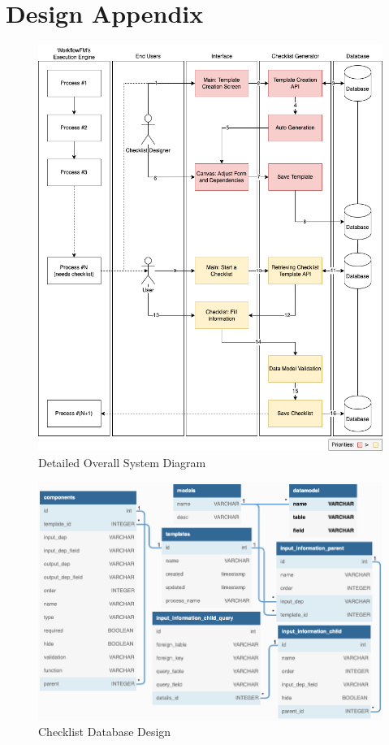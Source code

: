 \chapter{Design Appendix}
\begin{figure}[ht!]
    \centering
    \includegraphics[width=\textwidth]{overleaf/images/overall_system_diagram_full.png}
    \caption{Detailed Overall System Diagram}
    \label{appendix:fig:overall_system_diagram}
\end{figure}


\begin{figure}[ht]
    \centering
    \includegraphics[width=\textwidth]{overleaf/images/checklist_db_design.png}
    \caption{Checklist Database Design}
    \label{fig:checklist_db_design}
\end{figure}

